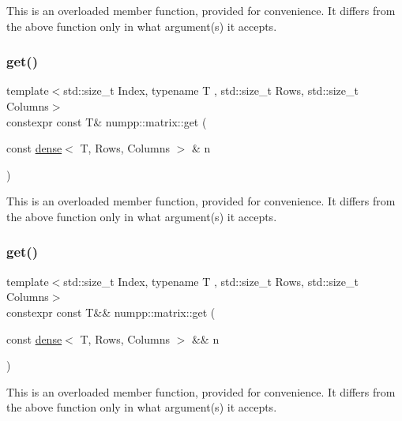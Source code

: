 This is an overloaded member function, provided for convenience. It differs from the above function only in what argument(s) it accepts.\mbox{\label{group__numpp__structures__matrices__dense_ga5587c6c4095d1147e35da4860e22df52}} 
\subsubsection{\texorpdfstring{get()}{get()}\hspace{0.1cm}{\footnotesize\ttfamily [3/4]}}
{\footnotesize\ttfamily template$<$std\+::size\+\_\+t Index, typename T , std\+::size\+\_\+t Rows, std\+::size\+\_\+t Columns$>$ \\
constexpr const T\& numpp\+::matrix\+::get (\begin{DoxyParamCaption}\item[{const \hyperlink{classnumpp_1_1matrix_1_1dense}{dense}$<$ T, Rows, Columns $>$ \&}]{n }\end{DoxyParamCaption})}

This is an overloaded member function, provided for convenience. It differs from the above function only in what argument(s) it accepts.\mbox{\label{group__numpp__structures__matrices__dense_ga8a016cefdf00f72d041d313318e7a2fc}} 
\subsubsection{\texorpdfstring{get()}{get()}\hspace{0.1cm}{\footnotesize\ttfamily [4/4]}}
{\footnotesize\ttfamily template$<$std\+::size\+\_\+t Index, typename T , std\+::size\+\_\+t Rows, std\+::size\+\_\+t Columns$>$ \\
constexpr const T\&\& numpp\+::matrix\+::get (\begin{DoxyParamCaption}\item[{const \hyperlink{classnumpp_1_1matrix_1_1dense}{dense}$<$ T, Rows, Columns $>$ \&\&}]{n }\end{DoxyParamCaption})}

This is an overloaded member function, provided for convenience. It differs from the above function only in what argument(s) it accepts.\mbox{\label{group__numpp__structures__matrices__dense_gaad33179f3c1ba4df7469b7e3b0da7dbf}} 
